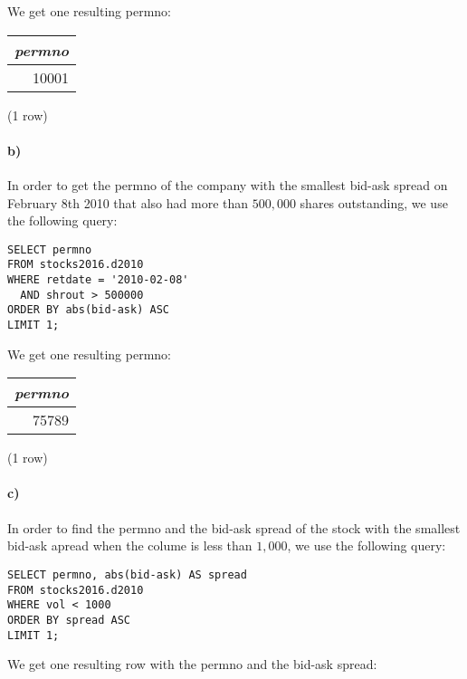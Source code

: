 \documentclass[]{article}
\let\oldparagraph\paragraph
\renewcommand{\paragraph}[1]{\oldparagraph{#1}\mbox{}}
\begin{document}
We get one resulting permno:

\begin{center}
\begin{tabular}{|r|}
\hline
\textit{permno} \\
\hline
10001 \\
\hline
\end{tabular}

\noindent (1 row) \\
\end{center}

\paragraph{b)}
In order to get the permno of the company with the smallest bid-ask spread on February 8th 2010 that also had more than $500,000$ shares outstanding, we use the following query:

\color{blue}
\begin{verbatim}
SELECT permno
FROM stocks2016.d2010
WHERE retdate = '2010-02-08'
  AND shrout > 500000
ORDER BY abs(bid-ask) ASC
LIMIT 1;
\end{verbatim}
\color{black}

We get one resulting permno:

\begin{center}
\begin{tabular}{|r|}
\hline
\textit{permno} \\
\hline
75789 \\
\hline
\end{tabular}

\noindent (1 row) \\
\end{center}

\paragraph{c)}
In order to find the permno and the bid-ask spread of the stock with the smallest bid-ask apread when the colume is less than $1,000$, we use the following query:

\color{blue}
\begin{verbatim}
SELECT permno, abs(bid-ask) AS spread
FROM stocks2016.d2010
WHERE vol < 1000
ORDER BY spread ASC
LIMIT 1;
\end{verbatim}
\color{black}

We get one resulting row with the permno and the bid-ask spread:
\end{document}
